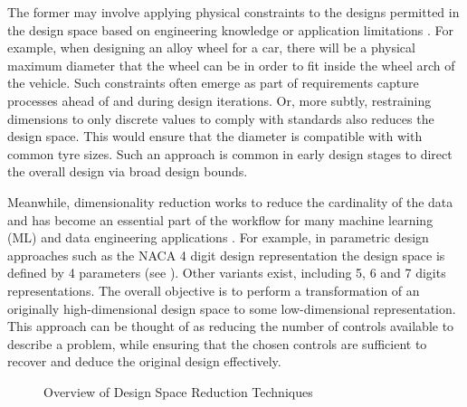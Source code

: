 \documentclass{article}
\begin{document}
The former may involve applying physical constraints to the designs permitted in the design space based on engineering knowledge or application limitations \citep{Serani2024}. For example, when designing an alloy wheel for a car, there will be a physical maximum diameter that the wheel can be in order to fit inside the wheel arch of the vehicle. Such constraints often emerge as part of requirements capture processes ahead of and during design iterations. Or, more subtly, restraining dimensions to only discrete values to comply with standards also reduces the design space. This would ensure that the diameter is compatible with with common tyre sizes. Such an approach is common in early design stages to direct the overall design via broad design bounds.

Meanwhile, dimensionality reduction works to reduce the cardinality of the data and has become an essential part of the workflow for many machine learning (ML) and data engineering applications \citep{Mendez2022}. For example, in parametric design approaches such as the NACA 4 digit design representation the design space is defined by 4 parameters (see \cite{Jacobs1933}). Other variants exist, including 5, 6 and 7 digits representations. The overall objective is to perform a transformation of an originally high-dimensional design space to some low-dimensional representation. This approach can be thought of as reducing the number of controls available to describe a problem, while ensuring that the chosen controls are sufficient to recover and deduce the original design effectively.

\begin{figure}[h!]
\centering
{}
\caption{Overview of Design Space Reduction Techniques}
\end{figure}
\end{document}
